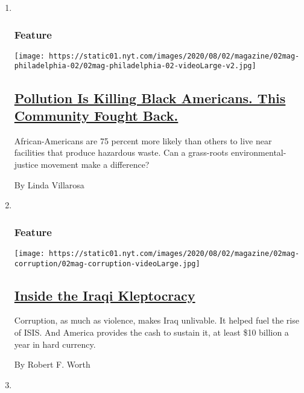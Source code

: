 \begin{enumerate}
\def\labelenumi{\arabic{enumi}.}
\item ~
  \hypertarget{feature-1}{%
  \subsubsection{Feature}\label{feature-1}}

  \texttt{[image: https://static01.nyt.com/images/2020/08/02/magazine/02mag-philadelphia-02/02mag-philadelphia-02-videoLarge-v2.jpg]}

  \hypertarget{pollution-is-killing-black-americans-this-community-fought-back}{%
  \subsection{\texorpdfstring{\href{/2020/07/28/magazine/pollution-philadelphia-black-americans.html}{Pollution
  Is Killing Black Americans. This Community Fought
  Back.}}{Pollution Is Killing Black Americans. This Community Fought Back.}}\label{pollution-is-killing-black-americans-this-community-fought-back}}

  African-Americans are 75 percent more likely than others to live near
  facilities that produce hazardous waste. Can a grass-roots
  environmental-justice movement make a difference?

  By Linda Villarosa
\item ~
  \hypertarget{feature-2}{%
  \subsubsection{Feature}\label{feature-2}}

  \texttt{[image: https://static01.nyt.com/images/2020/08/02/magazine/02mag-corruption/02mag-corruption-videoLarge.jpg]}

  \hypertarget{inside-the-iraqi-kleptocracy}{%
  \subsection{\texorpdfstring{\href{/2020/07/29/magazine/iraq-corruption.html}{Inside
  the Iraqi
  Kleptocracy}}{Inside the Iraqi Kleptocracy}}\label{inside-the-iraqi-kleptocracy}}

  Corruption, as much as violence, makes Iraq unlivable. It helped fuel
  the rise of ISIS. And America provides the cash to sustain it, at
  least \$10 billion a year in hard currency.

  By Robert F. Worth
\item ~
  \hypertarget{feature-3}{%
}
\end{enumerate}
